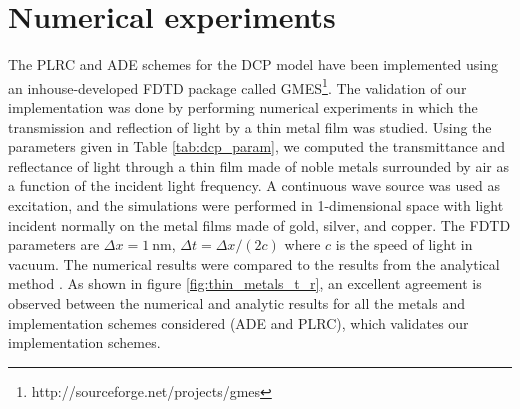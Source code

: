 \section{Numerical experiments}
The PLRC and ADE schemes for the DCP model have been implemented using an inhouse-developed FDTD package called GMES\footnote{http://sourceforge.net/projects/gmes}. The validation of our implementation was done by performing numerical experiments in which the transmission and reflection of light by a thin metal film was studied. Using the parameters given in Table \ref{tab:dcp_param}, we computed the transmittance and reflectance of light through a thin film made of noble metals surrounded by air as a function of the incident light frequency. A continuous wave source was used as excitation, and the simulations were performed in 1-dimensional space with light incident normally on the metal films made of gold, silver, and copper. The FDTD parameters are $\Delta x=1~\text{nm}$, $\Delta t=\Delta x/(2c)$ where $c$ is the speed of light in vacuum. The numerical results were compared to the results from the analytical method \cite{born_principles_1999}. As shown in figure \ref{fig:thin_metals_t_r}, an excellent agreement is observed between the numerical and analytic results for all the metals and implementation schemes considered  (ADE and PLRC), which validates our implementation schemes.

